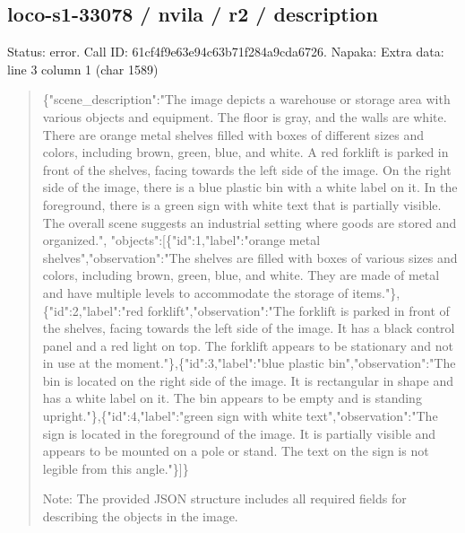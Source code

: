 \documentclass[10pt,a4paper]{article}
\begin{document}
\subsection*{loco-s1-33078 / nvila / r2 / description}
Status: error. Call ID: 61cf4f9e63e94c63b71f284a9cda6726. Napaka: Extra data: line 3 column 1 (char 1589)
\begin{quote}\footnotesize
\{"scene\_description":\allowbreak{}"The image depicts a warehouse or storage area with various objects and equipment. The floor is gray,\allowbreak{} and the walls are white. There are orange metal shelves filled with boxes of different sizes and colors,\allowbreak{} including brown,\allowbreak{} green,\allowbreak{} blue,\allowbreak{} and white. A red forklift is parked in front of the shelves,\allowbreak{} facing towards the left side of the image. On the right side of the image,\allowbreak{} there is a blue plastic bin with a white label on it. In the foreground,\allowbreak{} there is a green sign with white text that is partially visible. The overall scene suggests an industrial setting where goods are stored and organized.",\allowbreak{} "objects":\allowbreak{}[\{"id":\allowbreak{}1,\allowbreak{}"label":\allowbreak{}"oran\allowbreak{}ge metal shelves",\allowbreak{}"observation":\allowbreak{}"The shelves are filled with boxes of various sizes and colors,\allowbreak{} including brown,\allowbreak{} green,\allowbreak{} blue,\allowbreak{} and white. They are made of metal and have multiple levels to accommodate the storage of items."\},\allowbreak{}\{"id":\allowbreak{}2,\allowbreak{}"label":\allowbreak{}"red forklift",\allowbreak{}"observation":\allowbreak{}"The forklift is parked in front of the shelves,\allowbreak{} facing towards the left side of the image. It has a black control panel and a red light on top. The forklift appears to be stationary and not in use at the moment."\},\allowbreak{}\{"id":\allowbreak{}3,\allowbreak{}"label":\allowbreak{}"blue plastic bin",\allowbreak{}"observation":\allowbreak{}"The bin is located on the right side of the image. It is rectangular in shape and has a white label on it. The bin appears to be empty and is standing upright."\},\allowbreak{}\{"id":\allowbreak{}4,\allowbreak{}"label":\allowbreak{}"gree\allowbreak{}n sign with white text",\allowbreak{}"observation":\allowbreak{}"The sign is located in the foreground of the image. It is partially visible and appears to be mounted on a pole or stand. The text on the sign is not legible from this angle."\}]\}\par
\par
Note:\allowbreak{} The provided JSON structure includes all required fields for describing the objects in the image.
\end{quote}
\end{document}
